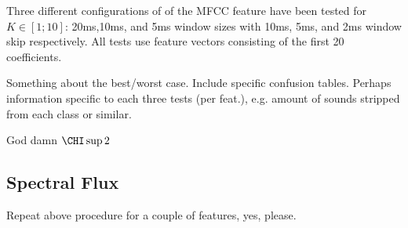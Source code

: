 		Three different configurations of of the MFCC feature have been tested for $K \in [1;10]$: 20ms,10ms, and 5ms window sizes with 10ms, 5ms, and 2ms window skip respectively. All tests use feature vectors consisting of the first 20 coefficients. 
		
		
		Something about the best/worst case. Include specific confusion tables. Perhaps information specific to each three tests (per feat.), e.g. amount of sounds stripped from each class or similar.
		
		God damn $\CHI\sup{2}$
		
		
			
		
		
			
	
	\subsection{Spectral Flux}
		Repeat above procedure for a couple of features, yes, please.